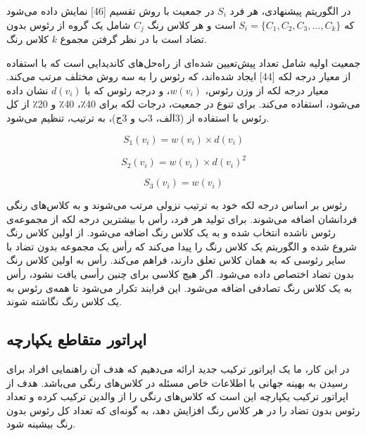 \documentclass[a4paper,10pt]{article}
\begin{document}
            در الگوریتم پیشنهادی، هر فرد $S_i$ در جمعیت با روش تقسیم [46] نمایش داده می‌شود که
            $S_i = \{C_1, C_2, C_3, \dots, C_k\}$
            است و هر کلاس رنگ $C_j$ شامل یک گروه از رئوس بدون تضاد است با در نظر گرفتن مجموع $k$ کلاس رنگ.

            جمعیت اولیه شامل تعداد پیش‌تعیین شده‌ای از راه‌حل‌های کاندیدایی است که با استفاده از معیار درجه لکه [44] ایجاد شده‌اند، که رئوس را به سه روش مختلف مرتب می‌کند. معیار درجه لکه از وزن رئوس، $w(v_i)$، و درجه رئوس که با $d(v_i)$ نشان داده می‌شود، استفاده می‌کند. برای تنوع در جمعیت، درجات لکه برای 40٪، 40٪ و 20٪ از کل رئوس با استفاده از (3الف، 3ب و 3ج)، به ترتیب، تنظیم می‌شود.

            \vspace{-0.5cm}

            \begin{equation}
                S_1 (v_i) = w(v_i) \times d(v_i)
            \end{equation}

            \vspace{-1cm}

            \begin{equation}
                S_2 (v_i) = w(v_i) \times d(v_i)^2
            \end{equation}

            \vspace{-1cm}

            \begin{equation}
                S_3 (v_i) = w(v_i)
            \end{equation}

            رئوس بر اساس درجه لکه خود به ترتیب نزولی مرتب می‌شوند و به کلاس‌های رنگی فردانشان اضافه می‌شوند. برای تولید هر فرد، رأس با بیشترین درجه لکه از مجموعه‌ی رئوس ناشده انتخاب شده و به یک کلاس رنگ اضافه می‌شود. از اولین کلاس رنگ شروع شده و الگوریتم یک کلاس رنگ را پیدا می‌کند که رأس یک مجموعه بدون تضاد با سایر رئوسی که به همان کلاس تعلق دارند، فراهم می‌کند. رأس به اولین کلاس رنگ بدون تضاد اختصاص داده می‌شود. اگر هیچ کلاسی برای چنین رأسی یافت نشود، رأس به یک کلاس رنگ تصادفی اضافه می‌شود. این فرایند تکرار می‌شود تا همه‌ی رئوس به یک کلاس رنگ نگاشته شوند.

        \subsection{اپراتور متقاطع یکپارچه}

            در این کار، ما یک اپراتور ترکیب جدید ارائه می‌دهیم که هدف آن راهنمایی افراد برای رسیدن به بهینه جهانی با اطلاعات خاص مسئله در کلاس‌های رنگی می‌باشد. هدف از اپراتور ترکیب یکپارچه این است که کلاس‌های رنگی را از والدین ترکیب کرده و تعداد رئوس بدون تضاد را در هر کلاس رنگ افزایش دهد، به گونه‌ای که تعداد کل رئوس بدون رنگ بیشینه شود.
\end{document}
